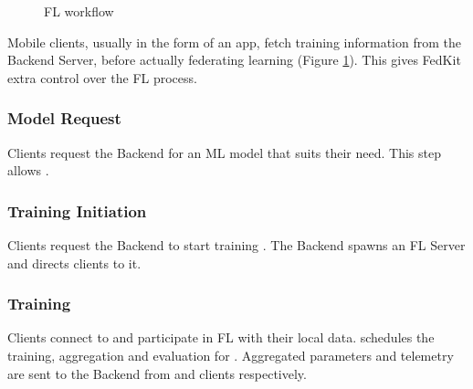 \documentclass[letterpaper]{article} %
\begin{document}
\begin{figure}
\centering
{}
\caption{FL workflow}
\label{fig:fl-workflow}
\end{figure}

Mobile clients, usually in the form of an app,
fetch training information from the Backend Server,
before actually federating learning (Figure \ref{fig:fl-workflow}).
This gives FedKit extra control over the FL process.

\newcommand{\modelreq}{Model Request}
\subsubsection{\modelreq}
Clients request the Backend for an ML model \model{} that suits their need.
This step allows \backendorin.

\subsubsection{Training Initiation}
Clients request the Backend to start training \model.
The Backend spawns an FL Server \fs{} and directs clients to it.

\subsubsection{Training}
Clients connect to \fs{} and participate in FL with their local data.
\fs{} schedules the training, aggregation and evaluation for \model.
Aggregated parameters and telemetry are sent to the Backend
from \fs{} and clients respectively.
\end{document}
